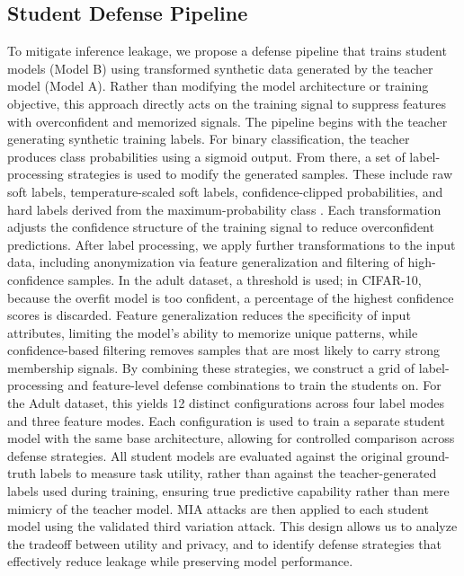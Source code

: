 \documentclass[conference]{IEEEtran}
\begin{document}
\subsection{Student Defense Pipeline}
To mitigate inference leakage, we propose a defense pipeline that trains student models (Model B) using transformed synthetic data generated by the teacher model (Model A). Rather than modifying the model architecture or training objective, this approach directly acts on the training signal to suppress features with overconfident and memorized signals.
The pipeline begins with the teacher generating synthetic training labels. For binary classification, the teacher produces class probabilities using a sigmoid output. From there, a set of label-processing strategies is used to modify the generated samples. These include raw soft labels, temperature-scaled soft labels, confidence-clipped probabilities, and hard labels derived from the maximum-probability class . Each transformation adjusts the confidence structure of the training signal to reduce overconfident predictions.
After label processing, we apply further transformations to the input data, including anonymization via feature generalization and filtering of high-confidence samples. In the adult dataset, a threshold is used; in CIFAR-10, because the overfit model is too confident, a percentage of the highest confidence scores is discarded. Feature generalization reduces the specificity of input attributes, limiting the model’s ability to memorize unique patterns, while confidence-based filtering removes samples that are most likely to carry strong membership signals.
By combining these strategies, we construct a grid of label-processing and feature-level defense combinations to train the students on. For the Adult dataset, this yields 12 distinct configurations across four label modes and three feature modes. Each configuration is used to train a separate student model with the same base architecture, allowing for controlled comparison across defense strategies.
All student models are evaluated against the original ground-truth labels to measure task utility, rather than against the teacher-generated labels used during training, ensuring true predictive capability rather than mere mimicry of the teacher model. MIA attacks are then applied to each student model using the validated third variation attack.
This design allows us to analyze the tradeoff between utility and privacy, and to identify defense strategies that effectively reduce leakage while preserving model performance.
\end{document}
